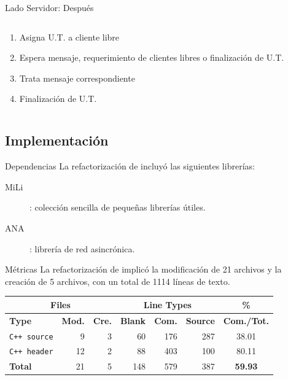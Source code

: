 \begin{frame}{Lado Servidor: Después}
\begin{columns}[T]
\begin{column}{.45\textwidth}
\begin{enumerate}
                \item   Asigna U.T. a cliente libre
                \vspace{0.2cm}
                \item   Espera mensaje, requerimiento de clientes libres o finalización de U.T.
                \vspace{0.2cm}
                \item   Trata mensaje correspondiente
                \vspace{0.2cm}
                \item   Finalización de U.T.
            \end{enumerate}
        \end{column}
    \end{columns}
\end{frame}


\subsection{Implementación}

\begin{frame}{Dependencias}
    La refactorización de \fud{} incluyó las siguientes librerías:
    \begin{description}
        \item[MiLi]: colección sencilla de pequeñas librerías útiles.
        \item[ANA]: librería de red asincrónica.
    \end{description}
\end{frame}

\begin{frame}{Métricas}
    La refactorización de \fud{} implicó la modificación de 21 archivos y la creación de 5 archivos, con un total de 1114 líneas de texto.
    \begin{center}
        \begin{tabular}{|l|r|r|r|r|r|c|}
            \hline
            \multicolumn{3}{|c|}{Files} & \multicolumn{3}{|c|}{Line Types} & \hspace{0.2cm}\% \\
            \hline
            \textbf{Type} & \textbf{Mod.} & \textbf{Cre.} & \textbf{Blank} & \textbf{Com.} & \textbf{Source} & \small{\textbf{Com./Tot.}}\\
            \hline
            \texttt{C++ source} & 9   & 3   &    60  &    176   &   287 & 38.01 \\
            \hline
            \texttt{C++ header} & 12  & 2   &    88  &    403   &   100 & 80.11 \\
            \hline
            \textbf{Total}      & 21  & 5   &   148  & \color{blue}579\color{black} & \color{blue}387\color{black} & \textbf{59.93} \\
            \hline
        \end{tabular}
    \end{center}
\end{frame}
